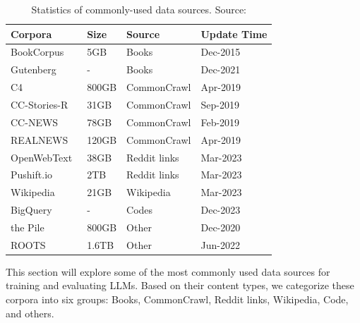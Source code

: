 \begin{table}[h]
	\centering
	\begin{tabularx}{\textwidth}{|X|X|X|X|}
		\hline
		\textbf{Corpora}                           & \textbf{Size} & \textbf{Source} & \textbf{Update Time} \\
		\hline
		BookCorpus~\cite{zhu2015aligning}          & 5GB           & Books           & Dec-2015             \\
		Gutenberg~\cite{projectgutenberg}          & -             & Books           & Dec-2021             \\
		C4~\cite{raffel2023exploring}              & 800GB         & CommonCrawl     & Apr-2019             \\
		CC-Stories-R~\cite{trinh2018simple}        & 31GB          & CommonCrawl     & Sep-2019             \\
		CC-NEWS~\cite{liu2019roberta}              & 78GB          & CommonCrawl     & Feb-2019             \\
		REALNEWS~\cite{zellers2019defending}       & 120GB         & CommonCrawl     & Apr-2019             \\
		OpenWebText~\cite{gokaslan2019openwebtext} & 38GB          & Reddit links    & Mar-2023             \\
		Pushift.io~\cite{baumgartner2020pushshift} & 2TB           & Reddit links    & Mar-2023             \\
		Wikipedia~\cite{wikipedia}                 & 21GB          & Wikipedia       & Mar-2023             \\
		BigQuery~\cite{bigquerydataset}            & -             & Codes           & Dec-2023             \\
		the Pile~\cite{gao2021pile}                & 800GB         & Other           & Dec-2020             \\
		ROOTS~\cite{laurencon2022bigscience}       & 1.6TB         & Other           & Jun-2022             \\
		\hline
	\end{tabularx}
	\caption{Statistics of commonly-used data sources. Source: \textcite{survey}}
	\label{tab:table}
\end{table}

This section will explore some of the most commonly used data sources for training and evaluating LLMs.
Based on their content types, we categorize these corpora into six groups: Books, CommonCrawl, Reddit links, Wikipedia, Code, and others.

